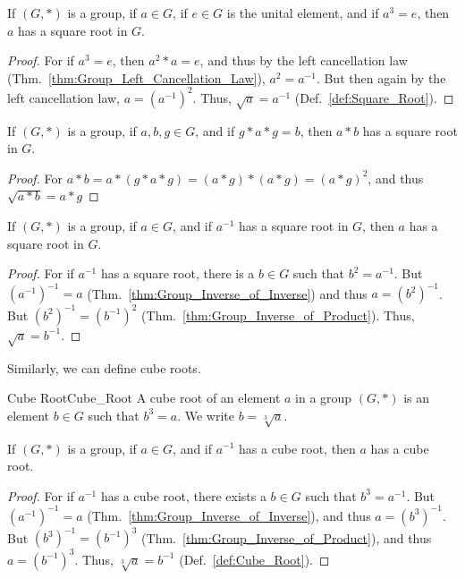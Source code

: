     \begin{theorem}
        If $(G,*)$ is a group, if $a\in{G}$, if $e\in{G}$ is the unital element,
        and if $a^{3}=e$, then $a$ has a square root in $G$.
    \end{theorem}
    \begin{proof}
        For if $a^{3}=e$, then $a^{2}*a=e$, and thus by the left cancellation
        law (Thm.~\ref{thm:Group_Left_Cancellation_Law}), $a^{2}=a^{\minus{1}}$.
        But then again by the left cancellation law, $a=(a^{\minus{1}})^{2}$.
        Thus, $\sqrt{a}=a^{\minus{1}}$ (Def.~\ref{def:Square_Root}).
    \end{proof}
    \begin{theorem}
        If $(G,*)$ is a group, if $a,b,g\in{G}$, and if $g*a*g=b$, then $a*b$
        has a square root in $G$.
    \end{theorem}
    \begin{proof}
        For $a*b=a*(g*a*g)=(a*g)*(a*g)=(a*g)^{2}$, and thus
        $\sqrt{a*b}=a*g$
    \end{proof}
    \begin{theorem}
        If $(G,*)$ is a group, if $a\in{G}$, and if $a^{\minus{1}}$ has a
        square root in $G$, then $a$ has a square root in $G$.
    \end{theorem}
    \begin{proof}
        For if $a^{\minus{1}}$ has a square root, there is a $b\in{G}$ such that
        $b^{2}=a^{\minus{1}}$. But $(a^{\minus{1}})^{\minus{1}}=a$
        (Thm.~\ref{thm:Group_Inverse_of_Inverse}) and thus
        $a=(b^{2})^{\minus{1}}$. But $(b^{2})^{\minus{1}}=(b^{\minus{1}})^{2}$
        (Thm.~\ref{thm:Group_Inverse_of_Product}). Thus,
        $\sqrt{a}=b^{\minus{1}}$.
    \end{proof}
    Similarly, we can define cube roots.
    \begin{fdefinition}{Cube Root}{Cube_Root}
        A cube root of an element $a$ in a \gls{group} $(G,*)$ is an element
        $b\in{G}$ such that $b^{3}=a$. We write $b=\sqrt[3]{a}$.
    \end{fdefinition}
    \begin{theorem}
        \label{thm:Group_inv_has_cube_root_implies_a_has_cube_root}%
        If $(G,*)$ is a group, if $a\in{G}$, and if $a^{\minus{1}}$ has a cube
        root, then $a$ has a cube root.
    \end{theorem}
    \begin{proof}
        For if $a^{\minus{1}}$ has a cube root, there exists a $b\in{G}$ such
        that $b^{3}=a^{\minus{1}}$. But $(a^{\minus{1}})^{\minus{1}}=a$
        (Thm.~\ref{thm:Group_Inverse_of_Inverse}), and thus
        $a=(b^{3})^{\minus{1}}$. But $(b^{3})^{\minus{1}}=(b^{\minus{1}})^{3}$
        (Thm.~\ref{thm:Group_Inverse_of_Product}), and thus
        $a=(b^{\minus{1}})^{3}$. Thus, $\sqrt[3]{a}=b^{\minus{1}}$
        (Def.~\ref{def:Cube_Root}).
    \end{proof}
